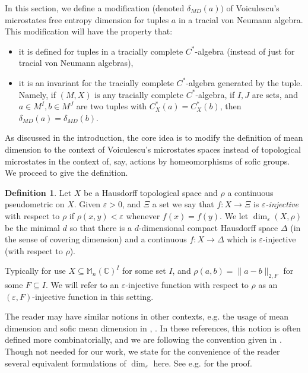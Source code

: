 \documentclass[10pt]{amsart}
\theoremstyle{definition}
\newtheorem{defn}[thm]{Definition}
\numberwithin{equation}{section}
\newcommand{\bC}{{\mathbb C}}
\newcommand{\bM}{{\mathbb M}}
\begin{document}
In this section, we define a modification (denoted $\delta_{MD}(a))$ of Voiculescu's microstates free entropy dimension for tuples $a$ in a tracial von Neumann algebra. This modification will have the property that:
\begin{itemize}
    \item it is defined for tuples in a tracially complete $C^{*}$-algebra (instead of just for tracial von Neumann algebras),
    \item it is an invariant for the tracially complete $C^{*}$-algebra generated by the tuple. Namely, if $(M,X)$ is any tracially complete $C^{*}$-algebra, if $I,J$ are sets, and $a\in M^{I},b\in M^{J}$ are two tuples with $C^{*}_{X}(a)=C^{*}_{X}(b)$, then $\delta_{MD}(a)=\delta_{MD}(b)$.
\end{itemize}
As discussed in the introduction, the core idea is to modify the definition of mean dimension to the context of Voiculescu's microstates spaces instead of topological microstates in the context of, say, actions by homeomorphisms of sofic groups. 
We proceed to give the definition. 
\begin{defn}
Let $X$ be a Hausdorff topological space and $\rho$ a continuous pseudometric on $X$. Given $\varepsilon>0$, and $\Xi$  a set we say that $f\colon X\to \Xi$ is \emph{$\varepsilon$-injective} with respect to $\rho$ if $\rho(x,y)<\varepsilon$ whenever $f(x)=f(y)$. 
We let $\dim_{\varepsilon}(X,\rho)$ be the minimal $d$ so that there is a $d$-dimensional compact Hausdorff space $\Delta$ (in the sense of covering dimension) and a continuous $f\colon X\to \Delta$ which is $\varepsilon$-injective (with respect to $\rho$).   
\end{defn}

Typically for use $X\subseteq \bM_{n}(\bC)^{I}$ for some set $I$, and $\rho(a,b)=\|a-b\|_{2,F}$ for some $F\subseteq I$. We will refer to an $\varepsilon$-injective function with respect to $\rho$ as an $(\varepsilon,F)$-injective function in this setting.

The reader may have similar notions in other contexts, e.g. the usage of mean dimension and sofic mean dimension in \cite[Section 4]{LindWeiss}, \cite[Section 4]{Li}. In these references, this notion is often defined more combinatorially, and we are following the convention given in \cite[Section 1.5]{Gro}. Though not needed for our work, we state for the convenience of the reader several equivalent formulations of $\dim_{\varepsilon}$ here. See e.g. \cite[Section 1.1]{UWEquiv} for the proof. 
\end{document}
